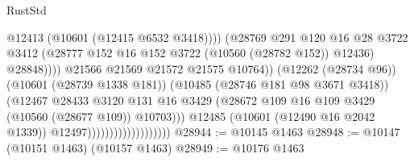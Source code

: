 \begin{lexlean}{RustStd}
\begin{coremodule}
                                                          @12413
                                                          (@10601 (@12415 @6532 @3418))))
                                                      (@28769
                                                        @291
                                                        @120
                                                        @16
                                                        @28
                                                        @3722
                                                        @3412
                                                        (@28777
                                                          @152
                                                          @16
                                                          @152
                                                          @3722
                                                          (@10560 (@28782 @152))
                                                          @12436)
                                                        @28848))))
                                                @21566
                                                @21569
                                                @21572
                                                @21575
                                                @10764))
                                            (@12262 (@28734 @96))
                                            (@10601 (@28739 @1338 @181))
                                            (@10485 (@28746 @181 @98 @3671 @3418))
                                            (@12467
                                              @28433
                                              @3120
                                              @131
                                              @16
                                              @3429
                                              (@28672
                                                @109
                                                @16
                                                @109
                                                @3429
                                                (@10560 (@28677 @109))
                                                @10703)))
                                          @12485
                                          (@10601 (@12490 @16 @2042 @1339))
                                          @12497)))))))))))))))))))
@28944 := @10145 @1463
@28948 := @10147 (@10151 @1463) (@10157 @1463)
@28949 := @10176 @1463

\end{coremodule}
\end{lexlean}
